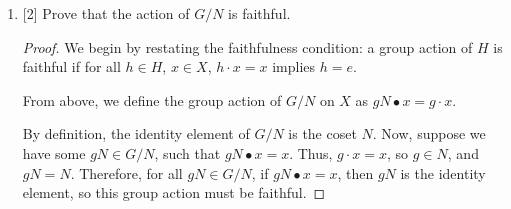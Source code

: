\documentclass{article}
\begin{document}
\begin{enumerate}
{        Now, we apply the group action \(g_1N \bullet x\) and \(g_2N \bullet x\).
        \begin{align}
            g_1N \bullet x &= g_2N \bullet x\\
            (g_1 * n_1) \cdot x &= (g_2*n_2) \cdot x\\
            g_1 \cdot x &= g_2 \cdot x.
        \end{align}
    }

    \item {
        [2] Prove that the action of \( G/ N \) is faithful.

        \begin{proof}
            We begin by restating the faithfulness condition: a group 
            action of \(H\) is faithful if for all \(h \in H\), \(x \in X\), 
            \(h \cdot x = x\) implies \(h = e\).

            From above, we define the group action of \(G/N\) on \(X\) as
            \(gN \bullet x = g \cdot x\).

            By definition, the identity element of \(G/N\) is the coset \(N\).
            Now, suppose we have some \(gN \in G/N\), such that \(gN \bullet x = x\).
            Thus, \(g \cdot x = x\), so \(g \in N\), and \(gN = N\). Therefore, 
            for all \(gN \in G/N\), if \(gN \bullet x = x\), then \(gN\) is the 
            identity element, so this group action must be faithful.
        \end{proof}
    }
\end{enumerate}
\end{document}
